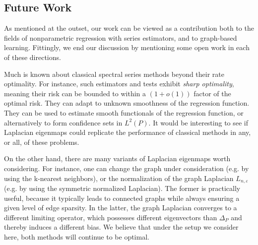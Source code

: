 \documentclass{article}
\newcommand{\1}{\mathbf{1}}
\theoremstyle{alden}
\theoremstyle{aldenthm}
\theoremstyle{definition}
\theoremstyle{remark}
\begin{document}
\subsection{Future Work}
As mentioned at the outset, our work can be viewed as a contribution both to the fields of nonparametric regression with series estimators, and to graph-based learning. Fittingly, we end our discussion by mentioning some open work in each of these directions. 

Much is known about classical spectral series methods beyond their rate optimality. For instance, such estimators and tests exhibit \emph{sharp optimality}, meaning their risk can be bounded to within a $(1 + o(1))$ factor of the optimal risk. They can adapt to unknown smoothness of the regression function. They can be used to estimate smooth functionals of the regression function, or alternatively to form confidence sets in $L^2(P)$. It would be interesting to see if Laplacian eigenmaps could replicate the performance of classical methods in any, or all, of these problems.

On the other hand, there are many variants of Laplacian eigenmaps worth considering. For instance, one can change the graph under consideration (e.g. by using the k-nearest neighbors), or the normalization of the graph Laplacian $L_{n,\varepsilon}$ (e.g. by using the symmetric normalized Laplacian). The former is practically useful, because it typically leads to connected graphs while always ensuring a given level of edge sparsity. In the latter, the graph Laplacian converges to a different limiting operator, which possesses different eigenvectors than $\Delta_P$ and thereby induces a different bias. We believe that under the setup we consider here, both methods will continue to be optimal.



 

\appendix


\end{document}
